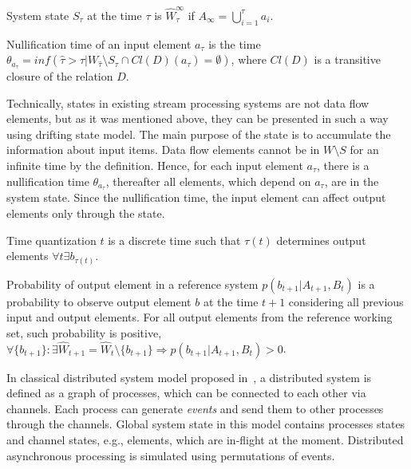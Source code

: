 \begin{definition}{System state}
$S_\tau$ at the time $\tau$ is $\widehat{W}_\tau^{\infty}$ if $A_{\infty}=\bigcup\limits_{i=1}^{\tau}{a_i}$.
\end{definition}

\begin{definition}{Nullification time}
of an input element $a_\tau$ is the time $\theta_{a_\tau}=inf(\hat{\tau}>\tau|W_{\hat{\tau}}\setminus{S_{\hat{\tau}}}\cap{Cl(D)(a_\tau)=\emptyset})$, where $Cl(D)$ is a transitive closure of the relation $D$.
\end{definition}

Technically, states in existing stream processing systems are not data flow elements, but as it was mentioned above, they can be presented in such a way using drifting state model. The main purpose of the state is to accumulate the information about input items. Data flow elements cannot be in $W\setminus{S}$ for an infinite time by the definition. Hence, for each input element $a_\tau$, there is a nullification time $\theta_{a_\tau}$, thereafter all elements, which depend on $a_\tau$, are in the system state. Since the nullification time, the input element can affect output elements only through the state.

\begin{definition}{Time quantization}
$t$ is a discrete time such that $\tau(t)$ determines output elements $\forall{t}\exists{b_{\tau(t)}}$.
\end{definition}

\begin{definition}{Probability of output element in a reference system}
$p(b_{t+1}|A_{t+1}, B_t)$ is a probability to observe output element $b$ at the time $t+1$ considering all previous input and output elements. For all output elements from the reference working set, such probability is positive,\\
$\forall{\{b_{t+1}\}:\exists{\widehat{W}_{t+1}=\widehat{W}_{t}\setminus{\{b_{t+1}\}}}} \Rightarrow p(b_{t+1}|A_{t+1}, B_t) > 0$.
\end{definition}

In classical distributed system model proposed in~\cite{Chandy:1985:DSD:214451.214456}, a distributed system is defined as a graph of processes, which can be connected to each other via channels. Each process can generate {\em events} and send them to other processes through the channels. Global system state in this model contains processes states and channel states, e.g., elements, which are in-flight at the moment. Distributed asynchronous processing is simulated using permutations of events. 

